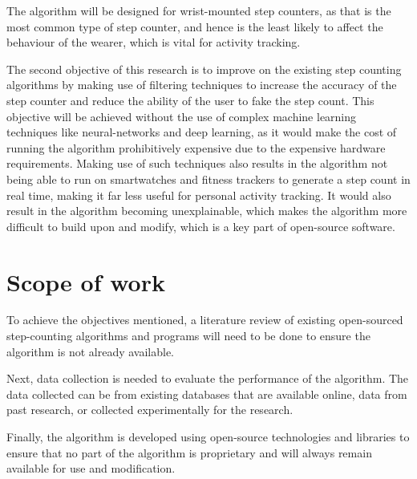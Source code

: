 \documentclass[12pt]{report}
\begin{document}
The algorithm will be designed for wrist-mounted step
counters, as that is the most common type of step counter,
and hence is the least likely to affect the behaviour of
the wearer, which is vital for activity tracking.

The second objective of this research is to improve on the existing
step counting algorithms by making use of filtering techniques
to increase the accuracy of the step counter and reduce the ability of
the user to fake the step count. This objective will be achieved
without the use of complex machine learning techniques like
neural-networks and deep learning, as it would make the cost of running
the algorithm prohibitively expensive due to the expensive hardware
requirements. Making use of such techniques also results in the
algorithm not being able to run on smartwatches and fitness trackers
to generate a step count in real time, making it far less useful
for personal activity tracking.
It would also result in the algorithm becoming unexplainable,
which makes the algorithm more difficult to build upon and modify,
which is a key part of open-source software.
\section{Scope of work}
\label{sec:orgf973d6f}
To achieve the objectives mentioned, a literature review of
existing open-sourced step-counting algorithms and programs
will need to be done to ensure the algorithm is not already available.

Next, data collection is needed to evaluate the performance
of the algorithm. The data collected can be from existing databases
that are available online, data from past research,
or collected experimentally for the research.

Finally, the algorithm is developed using open-source technologies
and libraries to ensure that no part of the algorithm is proprietary
and will always remain available for use and modification.

\clearpage
\end{document}
